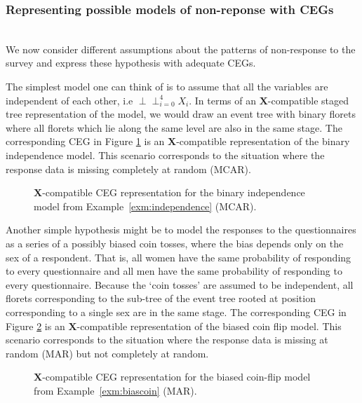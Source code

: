 \documentclass[runningheads]{llncs}
\newcommand{\ind}{\perp\!\!\!\!\perp}
\begin{document}
\subsubsection{Representing possible models of non-reponse with CEGs}\label{subsec:dropouts-hypothesis}
\hfill\\
We now consider different assumptions about the patterns of non-response to the survey and express these hypothesis with adequate CEGs. 
\begin{example}[Independence]
\label{exm:independence}
The simplest model one can think of is to assume that all the variables are independent of each other, i.e $\ind_{i=0}^{4}X_i$. In terms of an $\boldsymbol{X}$-compatible staged tree representation of the model, we would draw an event tree with binary florets where all florets which lie along the same level are also in the same stage. The corresponding CEG in Figure \ref{ceg:indep} is an $\boldsymbol{X}$-compatible representation of the binary independence model. This scenario corresponds to the situation where the response data is missing completely at random (MCAR).
\end{example}
\begin{figure}
\centering

\caption{$\boldsymbol{X}$-compatible CEG representation for the binary independence model from Example~\ref{exm:independence} (MCAR).}
\label{ceg:indep}
\end{figure}
\begin{example}
\label{exm:biascoin}
Another simple hypothesis might be to model the responses to the questionnaires as a series of a possibly biased coin tosses, where the bias depends only on the sex of a respondent. That is, all women have the same probability of responding to every questionnaire and all men have the same probability of responding to every questionnaire. Because the `coin tosses' are assumed to be independent, all florets corresponding to the sub-tree of the event tree rooted at position corresponding to a single sex are in the same stage. The corresponding CEG in Figure \ref{ceg:biascoin} is an $\boldsymbol{X}$-compatible representation of the biased coin flip model. This scenario corresponds to the situation where the response data is missing at random (MAR) but not completely at random.
\end{example}
\begin{figure}
\centering

\caption{$\boldsymbol{X}$-compatible CEG representation for the biased coin-flip model from Example~\ref{exm:biascoin} (MAR).}
\label{ceg:biascoin}
\end{figure}
\end{document}
